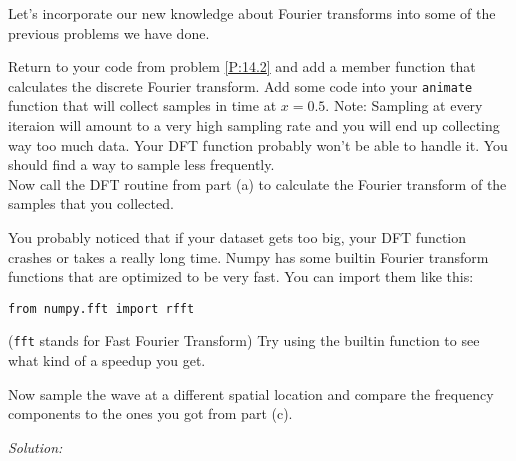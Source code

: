 \begin{enumerate}
\prob Let's incorporate our new knowledge about Fourier transforms
into some of the previous problems we have done.
\begin{enumerate}
  \subprob Return to your code from problem \ref{P:14.2} and add a
  member function that calculates the discrete Fourier transform.
  \subprob Add some code into your \texttt{animate} function that will
  collect samples in time at $x = 0.5$.  Note: Sampling at every
  iteraion will amount to a very high sampling rate and you will end
  up collecting way too much data. Your DFT function probably won't be
  able to handle it.  You should find a way to sample less frequently.\\

\subprob Now call the DFT routine from part (a) to calculate the
Fourier transform of the samples that you collected.

\subprob You probably noticed that if your dataset gets too big, your
DFT function crashes or takes a really long time.  Numpy has some
builtin Fourier transform functions that are optimized to be very
fast. You can import them like this:
\begin{Verbatim}
from numpy.fft import rfft
\end{Verbatim}
(\texttt{fft} stands for Fast Fourier Transform)
Try using the builtin function to see what kind of a speedup you get.

\subprob  Now sample the wave at a different spatial location and
compare the frequency components to the ones you got from part (c).
\end{enumerate}
\end{enumerate}
\ifsolutions
\textit{Solution:}\\
